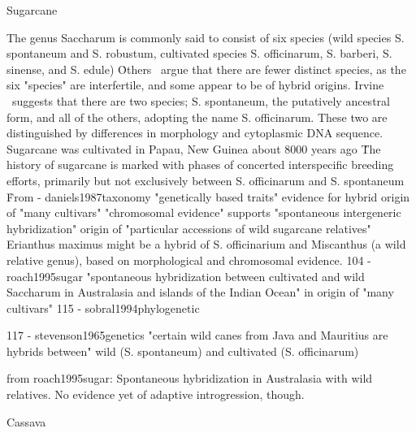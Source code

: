 \documentclass[11pt]{article}
\begin{document}
Sugarcane

The genus Saccharum is commonly said to consist of six species (wild species S. spontaneum and S. robustum, cultivated species S. officinarum, S. barberi, S. sinense, and S. edule) \cite{brandes1958origin, jackson2005breeding}\.
Others \cite{irvine1999saccharum}\ argue that there are fewer distinct species, as the six "species" are interfertile, and some appear to be of hybrid origins.
Irvine  \cite{irvine1999saccharum}\ suggests that there are two species; S. spontaneum, the putatively ancestral form, and all of the others, adopting the name S. officinarum.
These two are distinguished by differences in morphology and cytoplasmic DNA sequence.
Sugarcane was cultivated in Papau, New Guinea about 8000 years ago \cite{keyroyalbotanicalgardens, daniels1987taxonomy, artschwager1958sugarcane}\.
The history of sugarcane is marked with phases of concerted interspecific breeding efforts, primarily but not exclusively between S. officinarum and S. spontaneum \cite{roach1989origin}\.  

From \cite{ellstrand1999gene} - daniels1987taxonomy
    "genetically based traits" evidence for hybrid origin of "many cultivars"
    "chromosomal evidence" supports "spontaneous intergeneric hybridization" origin of "particular accessions of wild sugarcane relatives"
    Erianthus maximus might be a hybrid of S. officinarium and Miscanthus (a wild relative genus), based on morphological and chromosomal evidence.
104 - roach1995sugar
    "spontaneous hybridization between cultivated and wild Saccharum in Australasia and islands of the Indian Ocean" in origin of "many cultivars"
115 - sobral1994phylogenetic
    
117 - stevenson1965genetics
    "certain wild canes from Java and Mauritius are hybrids between" wild (S. spontaneum) and cultivated (S. officinarum)
    
 from roach1995sugar:
 Spontaneous hybridization in Australasia with wild relatives.
 No evidence yet of adaptive introgression, though.












Cassava
\end{document}
